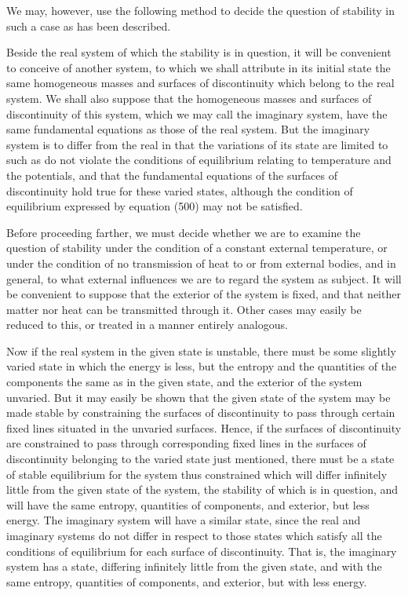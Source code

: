 \documentclass[12pt]{article}
\begin{document}
{We may, however, use the following method to decide the question of stability in such a case as has been described.

Beside the real system of which the stability is in question, it will be convenient to conceive of another system, to which we shall attribute in its initial state the same homogeneous masses and surfaces of discontinuity which belong to the real system. We shall also suppose that the homogeneous masses and surfaces of discontinuity of this system, which we may call the imaginary system, have the same fundamental equations as those of the real system. But the imaginary system is to differ from the real in that the variations of its state are limited to such as do not violate the conditions of equilibrium relating to temperature and the potentials, and that the fundamental equations of the surfaces of discontinuity hold true for these varied states, although the condition of equilibrium expressed by equation (500) may not be satisfied.

Before proceeding farther, we must decide whether we are to examine the question of stability under the condition of a constant external temperature, or under the condition of no transmission of heat to or from external bodies, and in general, to what external influences we are to regard the system as subject. It will be convenient to suppose that the exterior of the system is fixed, and that neither matter nor heat can be transmitted through it. Other cases may easily be reduced to this, or treated in a manner entirely analogous.

Now if the real system in the given state is unstable, there must be some slightly varied state in which the energy is less, but the entropy and the quantities of the components the same as in the given state, and the exterior of the system unvaried. But it may easily be shown that the given state of the system may be made stable by constraining the surfaces of discontinuity to pass through certain fixed lines situated in the unvaried surfaces. Hence, if the surfaces of discontinuity are constrained to pass through corresponding fixed lines in the surfaces of discontinuity belonging to the varied state just mentioned, there must be a state of stable equilibrium for the system thus constrained which will differ infinitely little from the given state of the system, the stability of which is in question, and will have the same entropy, quantities of components, and exterior, but less energy. The imaginary system will have a similar state, since the real and imaginary systems do not differ in respect to those states which satisfy all the conditions of equilibrium for each surface of discontinuity. That is, the imaginary system has a state, differing infinitely little from the given state, and with the same entropy, quantities of components, and exterior, but with less energy.

}
\end{document}

